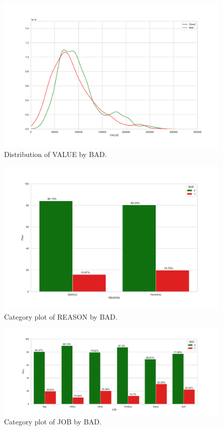\begin{figure}[!ht]
	\centering
	\includegraphics[scale=0.40]{figs/value_dist.pdf}
	\caption{Distribution of VALUE by BAD. \label{value_dist}}
\end{figure}

\begin{figure}[!ht]
	\centering
	\includegraphics[scale=0.40]{figs/reason_cat.pdf}
	\caption{Category plot of REASON by BAD. \label{reason_cat}}
\end{figure}

\begin{figure}[!ht]
	\centering
	\includegraphics[scale=0.40]{figs/job_cat.pdf}
	\caption{Category plot of JOB by BAD. \label{job_cat}}
\end{figure}

